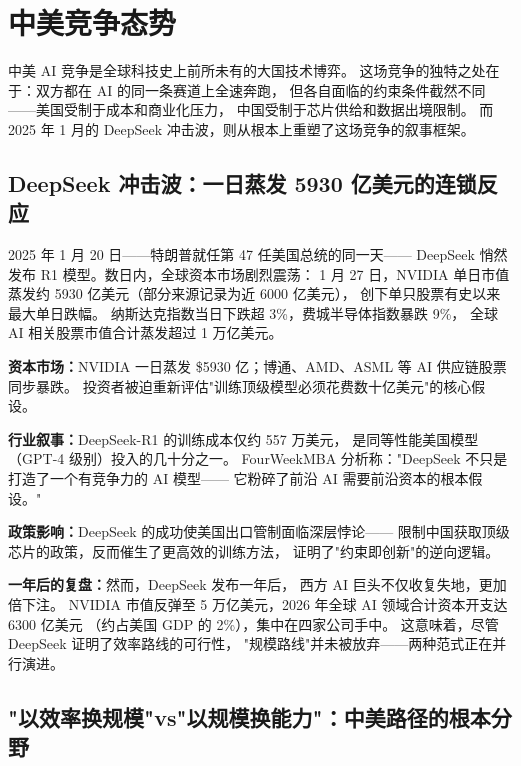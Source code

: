 \section{中美竞争态势}
\label{sec:china-competition}

中美 AI 竞争是全球科技史上前所未有的大国技术博弈。
这场竞争的独特之处在于：双方都在 AI 的同一条赛道上全速奔跑，
但各自面临的约束条件截然不同——美国受制于成本和商业化压力，
中国受制于芯片供给和数据出境限制。
而 2025 年 1 月的 DeepSeek 冲击波，则从根本上重塑了这场竞争的叙事框架。

\subsection{DeepSeek 冲击波：一日蒸发 5930 亿美元的连锁反应}
\label{subsec:china-deepseek-shockwave}

2025 年 1 月 20 日——特朗普就任第 47 任美国总统的同一天——
DeepSeek 悄然发布 R1 模型。数日内，全球资本市场剧烈震荡：
1 月 27 日，NVIDIA 单日市值蒸发约 5930 亿美元（部分来源记录为近 6000 亿美元），
创下单只股票有史以来最大单日跌幅。
纳斯达克指数当日下跌超 3\%，费城半导体指数暴跌 9\%，
全球 AI 相关股票市值合计蒸发超过 1 万亿美元。

\begin{keybox}
\textbf{资本市场：}NVIDIA 一日蒸发 \$5930 亿；博通、AMD、ASML 等 AI 供应链股票同步暴跌。
投资者被迫重新评估"训练顶级模型必须花费数十亿美元"的核心假设。

\textbf{行业叙事：}DeepSeek-R1 的训练成本仅约 557 万美元，
是同等性能美国模型（GPT-4 级别）投入的几十分之一。
FourWeekMBA 分析称："DeepSeek 不只是打造了一个有竞争力的 AI 模型——
它粉碎了前沿 AI 需要前沿资本的根本假设。"

\textbf{政策影响：}DeepSeek 的成功使美国出口管制面临深层悖论——
限制中国获取顶级芯片的政策，反而催生了更高效的训练方法，
证明了"约束即创新"的逆向逻辑。

\textbf{一年后的复盘：}然而，DeepSeek 发布一年后，
西方 AI 巨头不仅收复失地，更加倍下注。
NVIDIA 市值反弹至 5 万亿美元，2026 年全球 AI 领域合计资本开支达 6300 亿美元
（约占美国 GDP 的 2\%），集中在四家公司手中。
这意味着，尽管 DeepSeek 证明了效率路线的可行性，
"规模路线"并未被放弃——两种范式正在并行演进。
\end{keybox}

\subsection{"以效率换规模"vs"以规模换能力"：中美路径的根本分野}
\label{subsec:china-efficiency-vs-scale}

